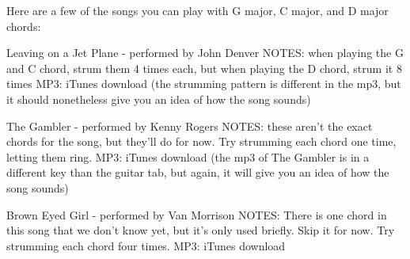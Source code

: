 Here are a few of the songs you can play with G major, C major, and D major chords: 

Leaving on a Jet Plane - performed by John Denver
NOTES: when playing the G and C chord, strum them 4 times each, but when playing the D chord, strum it 8 times
MP3: iTunes download
(the strumming pattern is different in the mp3, but it should nonetheless give you an idea of how the song sounds)

The Gambler - performed by Kenny Rogers
NOTES: these aren't the exact chords for the song, but they'll do for now. Try strumming each chord one time, letting them ring.
MP3: iTunes download
(the mp3 of The Gambler is in a different key than the guitar tab, but again, it will give you an idea of how the song sounds) 

Brown Eyed Girl - performed by Van Morrison
NOTES: There is one chord in this song that we don't know yet, but it's only used briefly. Skip it for now. Try strumming each chord four times.
MP3: iTunes download

